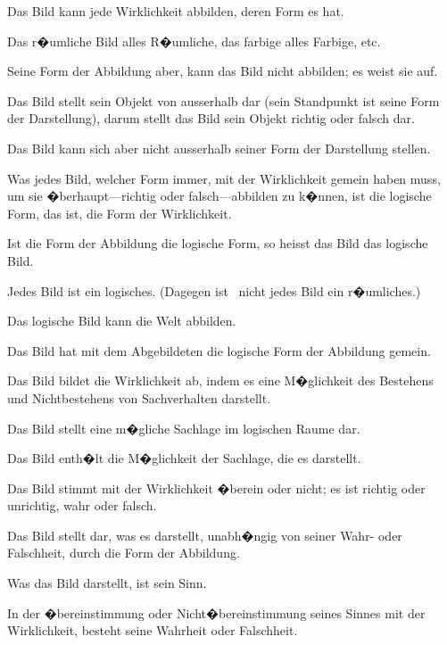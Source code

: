 \begin{propositions}
{Das Bild kann jede Wirklichkeit abbilden,
deren Form es hat.

Das r�umliche Bild alles R�umliche, das farbige
alles Farbige, etc.}


{Seine Form der Abbildung aber, kann das Bild
nicht abbilden; es weist sie auf.}


{Das Bild stellt sein Objekt von ausserhalb dar
(sein Standpunkt ist seine Form der Darstellung),
darum stellt das Bild sein Objekt richtig oder
falsch dar.}


{Das Bild kann sich aber nicht ausserhalb seiner
Form der Darstellung stellen.}


{Was jedes Bild, welcher Form immer, mit der
Wirklichkeit gemein haben muss, um sie �berhaupt---richtig
oder falsch---ab\-bil\-den zu k�nnen,
ist die logische Form, das ist, die Form der
Wirklichkeit.}


{Ist die Form der Abbildung die logische Form,
so heisst das Bild das logische Bild.}


{Jedes Bild ist  ein logisches. (Dagegen
ist \zumBeispiel\ nicht jedes Bild ein r�umliches.)}


{Das logische Bild kann die Welt abbilden.}


{Das Bild hat mit dem Abgebildeten die logische
Form der Abbildung gemein.}


{Das Bild bildet die Wirklichkeit ab, indem es
eine M�glichkeit des Bestehens und Nichtbestehens
von Sachverhalten darstellt.}


{Das Bild stellt eine m�gliche Sachlage im
logischen Raume dar.}


{Das Bild enth�lt die M�glichkeit der Sachlage,
die es darstellt.}


{Das Bild stimmt mit der Wirklichkeit �berein
oder nicht; es ist richtig oder unrichtig, wahr
oder falsch.}


{{\stretchyspace
Das Bild stellt dar, was es darstellt, unabh�ngig
von seiner Wahr- oder Falschheit, durch die Form
der Abbildung.}}


{Was das Bild darstellt, ist sein Sinn.}


{In der �bereinstimmung oder Nicht�bereinstimmung
seines Sinnes mit der Wirklichkeit,
besteht seine Wahrheit oder Falschheit.}



\end{propositions}
